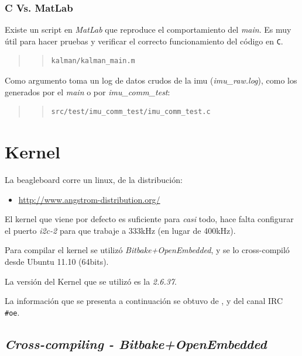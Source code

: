 \documentclass[main]{subfiles}
\begin{document}
\subsubsection{C Vs. MatLab}
\label{sec:codigo:c-vs-matlab}

Existe un script en \textit{MatLab} que reproduce el comportamiento del \textit{main}. Es muy útil para hacer pruebas y verificar el correcto funcionamiento del código en \verb+C+.

\begin{quote}
\begin{quote}
\begin{verbatim}
kalman/kalman_main.m
\end{verbatim}
\end{quote}
\end{quote}

Como argumento toma un log de datos crudos de la imu (\textit{imu\_raw.log}), como los generados por el \textit{main} o por \textit{imu\_comm\_test}:
\begin{quote}
\begin{quote}
\begin{verbatim}
src/test/imu_comm_test/imu_comm_test.c
\end{verbatim}
\end{quote}
\end{quote}

\section{Kernel}
\label{sec:codigo:kernel}

La beagleboard corre un linux, de la distribución:
\begin{itemize}
\item \url{http://www.angstrom-distribution.org/}
\end{itemize}
El kernel que viene por defecto es suficiente para \textit{casi} todo, hace falta configurar el puerto \textit{i2c-2} para que trabaje a 333kHz (en lugar de 400kHz).

Para compilar el kernel se utilizó \textit{Bitbake+OpenEmbedded}, y se lo cross-compiló desde Ubuntu 11.10 (64bits).

La versión del Kernel que se utilizó es la \textit{2.6.37}.

La información que se presenta a continuación se obtuvo de \cite{bib:oe-capture-changes}, \cite{bib:oe-angstrom-kernel-workflow} y del canal IRC \verb+#oe+.

\subsection{\textit{Cross-compiling - Bitbake+OpenEmbedded}}
\label{sec:codigo:cross-compiling-bitbake-oe}
\end{document}
